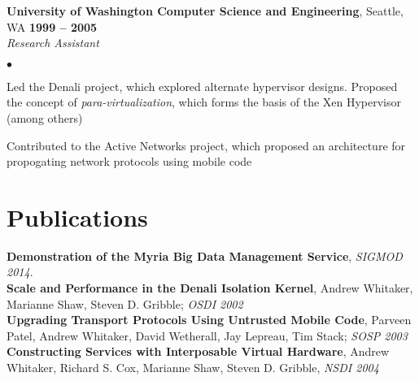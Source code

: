 \documentclass[margin,line]{res}
\newenvironment{list2}{
  \begin{list}{$\bullet$}{%
      \setlength{\itemsep}{0in}
      \setlength{\parsep}{0in} \setlength{\parskip}{0in}
      \setlength{\topsep}{0in} \setlength{\partopsep}{0in} 
      \setlength{\leftmargin}{0.2in}}}{\end{list}}
\begin{document}
\begin{resume}
\textbf{University of Washington Computer Science and Engineering}, Seattle,
WA \hfill \textbf{1999 -- 2005}\\\vspace{-4mm}
\textsl{Research Assistant} \\
\begin{list2}
  \item Led the Denali project, which explored alternate hypervisor
    designs.  Proposed the concept of \textit{para-virtualization}, which forms the
    basis of the Xen Hypervisor (among others)
 \item Contributed to the Active Networks project, which proposed an
   architecture for propogating network protocols using mobile code
\end{list2}

\section{\sc Publications}
\textbf{Demonstration of the Myria Big Data Management Service}, \textit{SIGMOD 2014}.\\
\textbf{Scale and Performance in the Denali Isolation Kernel}, Andrew
Whitaker, Marianne Shaw, Steven D. Gribble; \textit{OSDI 2002}\\
\textbf{Upgrading Transport Protocols Using Untrusted Mobile Code}, Parveen
Patel, Andrew Whitaker, David Wetherall, Jay Lepreau, Tim Stack; \textit{SOSP 2003} \\
\textbf{Constructing Services with Interposable Virtual Hardware}, Andrew
Whitaker, Richard S. Cox, Marianne Shaw, Steven D. Gribble, \textit{NSDI 2004}\\

\end{resume}
\end{document}
